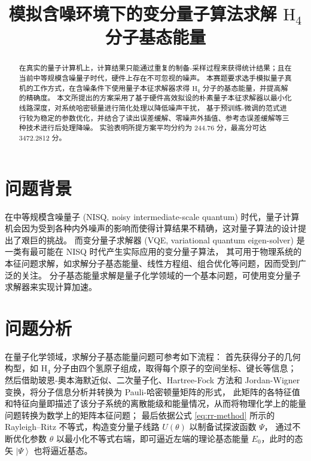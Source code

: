 \documentclass[withoutpreface,bwprint]{cumcmthesis}
\title{模拟含噪环境下的变分量子算法求解 $ \mathrm{H}_4 $ 分子基态能量}
\begin{document}
\maketitle
\begin{abstract}
在真实的量子计算机上，计算结果只能通过重复的制备-采样过程来获得统计结果；且在当前中等规模含噪量子时代，硬件上存在不可忽视的噪声。
本赛题要求选手模拟量子真机的工作方式，在含噪条件下使用量子本征求解器求得 $ \mathrm{H}_4 $ 分子的基态能量，并提高解的精确度。
本文所提出的方案采用了基于硬件高效拟设的朴素量子本征求解器以最小化线路深度，对系统哈密顿量进行简化处理以降低噪声干扰，
基于预训练-微调的范式进行较为稳定的参数优化，并结合了读出误差缓解、零噪声外插值、参考态误差缓解等三种技术进行后处理降噪。
实验表明所提方案平均分约为 244.76 分，最高分可达 3472.2812 分。

\end{abstract}




\section{问题背景}

在中等规模含噪量子 (NISQ, noisy intermediate-scale quantum) 时代，量子计算机会因为受到各种内外噪声的影响而使得计算结果不精确，这对量子算法的设计提出了艰巨的挑战。
而变分量子求解器 (VQE, variational quantum eigen-solver) 是一类有最可能在 NISQ 时代产生实际应用的变分量子算法，
其可用于物理系统的本征问题求解，如求解分子基态能量、线性方程组、组合优化等问题，因而受到广泛的关注。
分子基态能量求解是量子化学领域的一个基本问题，可使用变分量子求解器来实现计算加速。


\section{问题分析}

在量子化学领域，求解分子基态能量问题可参考如下流程：
首先获得分子的几何构型，如 $ \mathrm{H}_4 $ 分子由四个氢原子组成，取得每个原子的空间坐标、键长等信息；
然后借助玻恩-奧本海默近似、二次量子化、Hartree-Fock 方法和 Jordan-Wigner 变换，将分子信息分析并转换为 Pauli-哈密顿量矩阵的形式，
此矩阵的各特征值和特征向量即描述了该分子系统的离散能级和能量情况，从而将物理化学上的能量问题转换为数学上的矩阵本征问题；
最后依据公式 \ref{eq:rr-method} 所示的 Rayleigh–Ritz 不等式，构造变分量子线路 $ U(\theta) $ 以制备试探波函数 $ \Psi $，
通过不断优化参数 $ \theta $ 以最小化不等式右端，即可逼近左端的理论基态能量 $ E_0 $，此时的态矢 $ \left| \Psi \right> $ 也将逼近基态。
\end{document}
